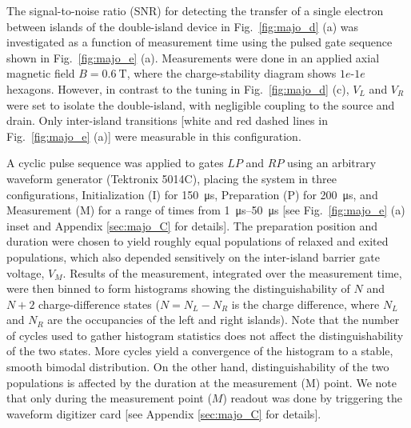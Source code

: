 The signal-to-noise ratio (SNR) for detecting the transfer of a single electron between islands of the double-island device in Fig.~\ref{fig:majo_d} (a) was investigated as a function of measurement time using the pulsed gate sequence shown in Fig.~\ref{fig:majo_e} (a). Measurements were done in an applied axial magnetic field $B = \SI{0.6}{\tesla}$, where the charge-stability diagram shows $1e$-$1e$ hexagons. However, in contrast to the tuning in Fig.~\ref{fig:majo_d} (c), $V_{L}$ and $V_{R}$ were set to isolate the double-island, with negligible coupling to the source and drain. Only inter-island transitions [white and red dashed lines in Fig.~\ref{fig:majo_e} (a)] were measurable in this configuration.

A cyclic pulse sequence was applied to gates $LP$ and $RP$ using an arbitrary waveform generator (Tektronix 5014C), placing the system in three configurations, Initialization (I) for \SI{150}{\micro\second}, Preparation (P) for \SI{200}{\micro\second}, and Measurement (M) for a range of times from \SIrange{1}{50}{\micro\second}  [see Fig.~\ref{fig:majo_e} (a) inset and Appendix \ref{sec:majo_C} for details]. The preparation position and duration were chosen to yield roughly equal populations of relaxed and exited populations, which also depended sensitively on the inter-island barrier gate voltage, $V_{M}$. Results of the measurement, integrated over the measurement time, were then binned to form histograms showing the distinguishability of $N$ and $N+2$ charge-difference states ($N = N_{L} - N_{R}$ is the charge difference, where $N_{L}$ and $N_{R}$ are the occupancies of the left and right islands). Note that the number of cycles used to gather histogram statistics does not affect the distinguishability of the two states. More cycles yield a convergence of the histogram to a stable, smooth bimodal distribution. On the other hand, distinguishability of the two populations is affected by the duration at the measurement (M) point. We note that only during the measurement point ($M$) readout was done by triggering the waveform digitizer card [see Appendix \ref{sec:majo_C} for details].

